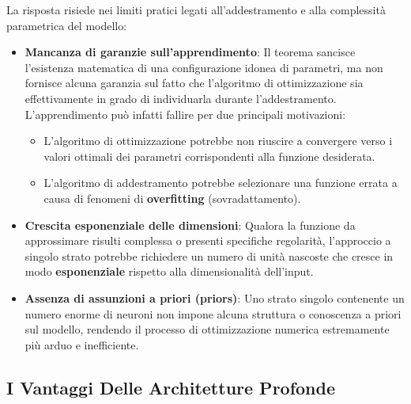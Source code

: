 ﻿\documentclass[11pt, a4paper]{article}
\begin{document}
La risposta risiede nei limiti pratici legati all'addestramento e alla complessità parametrica del modello:
\begin{itemize}
    \item \textbf{Mancanza di garanzie sull'apprendimento}: Il teorema sancisce l'esistenza matematica di una configurazione idonea di parametri, ma non fornisce alcuna garanzia sul fatto che l'algoritmo di ottimizzazione sia effettivamente in grado di individuarla durante l'addestramento. L'apprendimento può infatti fallire per due principali motivazioni:
    \begin{itemize}[noitemsep]
        \item L'algoritmo di ottimizzazione potrebbe non riuscire a convergere verso i valori ottimali dei parametri corrispondenti alla funzione desiderata.
        \item L'algoritmo di addestramento potrebbe selezionare una funzione errata a causa di fenomeni di \textbf{overfitting} (sovradattamento).
    \end{itemize}
    \item \textbf{Crescita esponenziale delle dimensioni}: Qualora la funzione da approssimare risulti complessa o presenti specifiche regolarità, l'approccio a singolo strato potrebbe richiedere un numero di unità nascoste che cresce in modo \textbf{esponenziale} rispetto alla dimensionalità dell'input.
    \item \textbf{Assenza di assunzioni a priori (priors)}: Uno strato singolo contenente un numero enorme di neuroni non impone alcuna struttura o conoscenza a priori sul modello, rendendo il processo di ottimizzazione numerica estremamente più arduo e inefficiente.
\end{itemize}

\subsection{I Vantaggi Delle Architetture Profonde}
\end{document}
